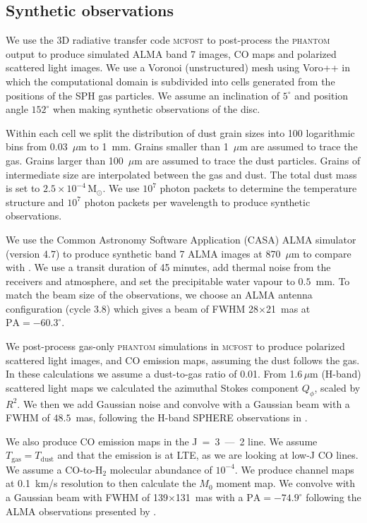 \documentclass[usenatbib,a4paper,times]{mnras}
\renewcommand{\sun}{\mathrm{M}_{\odot}}
\newcommand{\mcfost}{\textsc{mcfost}}
\renewcommand{\phantom}{\textsc{phantom}}
\begin{document}
\subsection{Synthetic observations}

We use the 3D radiative transfer code \mcfost{} \citep{pinte:2006, pinte:2009}
to post-process the \phantom{} output to produce simulated ALMA band 7 images,
CO maps and polarized scattered light images. We use a Voronoi (unstructured)
mesh using Voro++ \citep{rycroft:2009} in which the computational domain is
subdivided into cells generated from the positions of the SPH gas particles. We
assume an inclination of $5^{\circ}$ and position angle $152^{\circ}$
\citep{huang:2018} when making synthetic observations of the disc.

Within each cell we split the distribution of dust grain sizes into 100
logarithmic bins from 0.03~$\mu$m to 1~mm. Grains smaller than 1~$\mu$m are
assumed to trace the gas. Grains larger than 100~$\mu$m are assumed to trace the
dust particles. Grains of intermediate size are interpolated between the gas and
dust. The total dust mass is set to $2.5\times 10^{-4}\,\sun{}$. We use $10^7$
photon packets to determine the temperature structure and $10^7$ photon packets
per wavelength to produce synthetic observations.

We use the Common Astronomy Software Application (CASA) ALMA simulator (version
4.7) to produce synthetic band 7 ALMA images at 870~$\mu$m to compare with
\citet{andrews:2016}. We use a transit duration of 45 minutes, add thermal noise
from the receivers and atmosphere, and set the precipitable water vapour to
$0.5$~mm. To match the beam size of the observations, we choose an ALMA antenna
configuration (cycle 3.8) which gives a beam of FWHM 28$\times$21~mas at
$\mathrm{PA}=-60.3^{\circ}$.

We post-process gas-only \phantom{} simulations in \mcfost{} to produce
polarized scattered light images, and CO emission maps, assuming the dust
follows the gas. In these calculations we assume a dust-to-gas ratio of 0.01.
From 1.6$\,\mu$m (H-band) scattered light maps we calculated the azimuthal
Stokes component $Q_{\phi}$, scaled by $R^2$. We then we add Gaussian noise and
convolve with a Gaussian beam with a FWHM of $48.5$~mas, following the H-band
SPHERE observations in \citet{van-boekel:2017}.

We also produce CO emission maps in the J~=~3~---~2 line. We assume
$T_{\mathrm{gas}} = T_{\mathrm{dust}}$ and that the emission is at LTE, as we
are looking at low-J CO lines. We assume a CO-to-H${}_2$ molecular abundance of
$10^{-4}$. We produce channel maps at 0.1~km/s resolution to then calculate the
$M_0$ moment map. We convolve with a Gaussian beam with FWHM of
139$\times$131~mas with a $\mathrm{PA}=-74.9^{\circ}$ following the ALMA
observations presented by \citet{huang:2018}.
\end{document}
